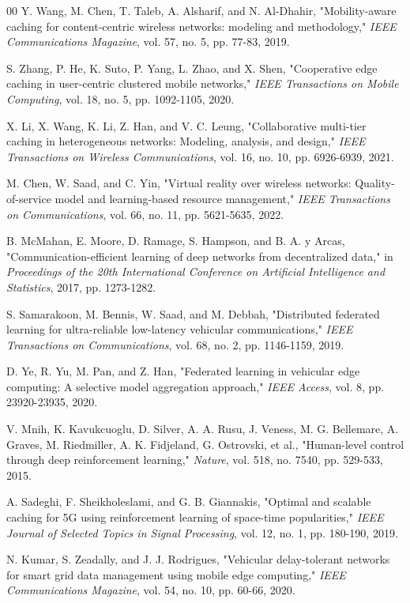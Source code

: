 \documentclass[conference]{IEEEtran}
\begin{document}
\begin{thebibliography}{00}
 Y. Wang, M. Chen, T. Taleb, A. Alsharif, and N. Al-Dhahir, "Mobility-aware caching for content-centric wireless networks: modeling and methodology," \textit{IEEE Communications Magazine}, vol. 57, no. 5, pp. 77-83, 2019.

 S. Zhang, P. He, K. Suto, P. Yang, L. Zhao, and X. Shen, "Cooperative edge caching in user-centric clustered mobile networks," \textit{IEEE Transactions on Mobile Computing}, vol. 18, no. 5, pp. 1092-1105, 2020.

 X. Li, X. Wang, K. Li, Z. Han, and V. C. Leung, "Collaborative multi-tier caching in heterogeneous networks: Modeling, analysis, and design," \textit{IEEE Transactions on Wireless Communications}, vol. 16, no. 10, pp. 6926-6939, 2021.

 M. Chen, W. Saad, and C. Yin, "Virtual reality over wireless networks: Quality-of-service model and learning-based resource management," \textit{IEEE Transactions on Communications}, vol. 66, no. 11, pp. 5621-5635, 2022.

 B. McMahan, E. Moore, D. Ramage, S. Hampson, and B. A. y Arcas, "Communication-efficient learning of deep networks from decentralized data," in \textit{Proceedings of the 20th International Conference on Artificial Intelligence and Statistics}, 2017, pp. 1273-1282.

 S. Samarakoon, M. Bennis, W. Saad, and M. Debbah, "Distributed federated learning for ultra-reliable low-latency vehicular communications," \textit{IEEE Transactions on Communications}, vol. 68, no. 2, pp. 1146-1159, 2019.

 D. Ye, R. Yu, M. Pan, and Z. Han, "Federated learning in vehicular edge computing: A selective model aggregation approach," \textit{IEEE Access}, vol. 8, pp. 23920-23935, 2020.

 V. Mnih, K. Kavukcuoglu, D. Silver, A. A. Rusu, J. Veness, M. G. Bellemare, A. Graves, M. Riedmiller, A. K. Fidjeland, G. Ostrovski, et al., "Human-level control through deep reinforcement learning," \textit{Nature}, vol. 518, no. 7540, pp. 529-533, 2015.

 A. Sadeghi, F. Sheikholeslami, and G. B. Giannakis, "Optimal and scalable caching for 5G using reinforcement learning of space-time popularities," \textit{IEEE Journal of Selected Topics in Signal Processing}, vol. 12, no. 1, pp. 180-190, 2019.

 N. Kumar, S. Zeadally, and J. J. Rodrigues, "Vehicular delay-tolerant networks for smart grid data management using mobile edge computing," \textit{IEEE Communications Magazine}, vol. 54, no. 10, pp. 60-66, 2020.

\end{thebibliography}
\end{document}
